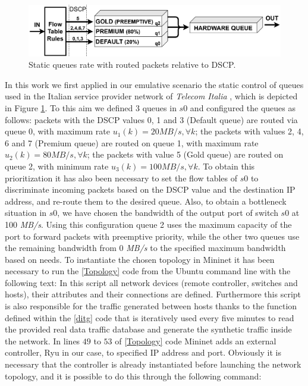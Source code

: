 \begin{figure}[tb!]
	\centering
	\includegraphics[keepaspectratio,width=\columnwidth]{figure/QUEUE.eps}
	\caption{Static queues rate with routed packets relative to DSCP.}
	\label{fig:{queue}}
\end{figure}

In this work we first applied in our emulative scenario the static control of queues used in the Italian service provider network of \textit{Telecom Italia} \cite{Notiziario}, which is depicted in Figure \ref{fig:{queue}}. To this aim we defined 3 queues in $s0$ and configured the queues as follows: packets with the DSCP values 0, 1 and 3 (Default queue) are routed via queue 0, with maximum rate $u_1(k) = 20 \textit{MB/s}, \forall k$; the packets with values 2, 4, 6 and 7 (Premium queue) are routed on queue 1, with maximum rate $u_2(k) = 80 \textit{MB/s}, \forall k$; the packets with value 5 (Gold queue) are routed on queue 2, with minimum rate $u_3(k) = 100 \textit{MB/s}, \forall k$. To obtain this prioritization it has also been necessary to set the flow tables of $s0$ to discriminate incoming packets based on the DSCP value and the destination IP address, and re-route them to the desired queue. Also, to obtain a bottleneck situation in $s0$, we have chosen the bandwidth of the output port of switch $s0$ at 100 \textit{MB/s}. Using this configuration queue 2 uses the maximum capacity of the port to forward packets with preemptive priority, while the other two queues use the remaining bandwidth from 0 \textit{MB/s} to the specified maximum bandwidth based on needs.
To instantiate the chosen topology in Mininet it has been necessary to run the \ref{Topology} code from the Ubuntu command line with the following text:
\noindent In this script all network devices (remote controller, switches and hosts), their attributes and their connections are defined. Furthermore this script is also responsible for the traffic generated between hosts thanks to the function defined within the \ref{ditg} code that is iteratively used every five minutes to read the provided real data traffic database and generate the synthetic traffic inside the network. In lines $49$ to $53$ of \ref{Topology} code Mininet adds an external controller, Ryu in our case, to specified IP address and port. Obviously it is necessary that the controller is already instantiated before launching the network topology, and it is possible to do this through the following command:
